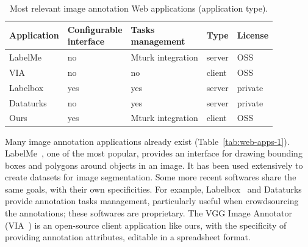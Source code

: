 \begin{table}[ht]
\centering
\begin{tabular}{lllll}
Application
    & \makecell[l]{Configurable\\interface}
    & \makecell[l]{Tasks\\management}
    & Type
    & License \\
    \midrule
LabelMe
    & no
    & Mturk integration
    & server
    & OSS \\
VIA
    & no
    & no
    & client
    & OSS \\
Labelbox
    & yes
    & yes
    & server
    & private \\
Dataturks
    & no
    & yes
    & server
    & private \\
Ours
    & yes
    & Mturk integration
    & client
    & OSS \\
\end{tabular}
\caption{Most relevant image annotation Web applications (application type).}%
\label{tab:web-apps-2}
\end{table}


Many image annotation applications already exist (Table~\ref{tab:web-apps-1}).
LabelMe~\cite{russell2008labelme}, one of the most popular,
provides an interface for drawing bounding boxes and polygons
around objects in an image.
It has been used extensively to create datasets for image segmentation.
Some more recent softwares share the same goals, with their own specificities.
For example, Labelbox~\cite{labelbox} and
Dataturks~\cite{dataturks} provide annotation tasks management,
particularly useful when crowdsourcing the annotations;
these softwares are proprietary.
The VGG Image Annotator (VIA~\cite{dutta2016via})
is an open-source client application like ours,
with the specificity of providing annotation attributes,
editable in a spreadsheet format.

